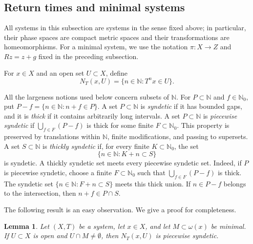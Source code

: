\documentclass[reqno,12pt]{amsart}
\newtheorem{lemma}[thm]{Lemma}
\newcommand{\Nzero}{\mathbb N_0}
\def \N {\mathbb N}
\def \Z {\mathbb Z}
\numberwithin{equation}{section}
\begin{document}

\subsection{Return times and minimal systems}

All systems in this subsection are systems in the sense fixed above; in
particular, their phase spaces are compact metric spaces and their
transformations are homeomorphisms. For a minimal system, we use the
notation $\pi:X\to Z$ and $Rz=z+g$ fixed in the preceding subsection.

For $x\in X$ and an open set $U\subset X$, define
\[
 N_T(x,U)=\{n\in\N:T^nx\in U\}.
\]

All the largeness notions used below concern subsets of $\N$. For
$P\subset\N$ and $f\in\Nzero$, put
$P-f=\{n\in\N:n+f\in P\}$. A set $P\subset\N$ is \emph{syndetic} if it
has bounded gaps, and it is \emph{thick} if it contains arbitrarily long
intervals. A set $P\subset\N$ is \emph{piecewise syndetic} if
$\bigcup_{f\in F}(P-f)$ is thick for some finite $F\subset\Nzero$. This
property is preserved by translations within $\N$, finite modifications,
and passing to supersets. A set $S\subset\N$ is \emph{thickly syndetic}
if, for every finite $K\subset\Nzero$, the set
\[
 \{n\in\N:K+n\subset S\}
\]
is syndetic. A thickly syndetic set meets every piecewise syndetic set.
Indeed, if $P$ is piecewise syndetic, choose a finite
$F\subset\Nzero$ such that $\bigcup_{f\in F}(P-f)$ is thick. The
syndetic set $\{n\in\N:F+n\subset S\}$ meets this thick union. If
$n\in P-f$ belongs to the intersection, then $n+f\in P\cap S$.

The following result is an easy observation. We give a proof for completeness.

\begin{lemma}\label{lem:ps-return}
Let $(X,T)$ be a system, let $x\in X$, and let
$M\subset\omega(x)$ be minimal. If $U\subset X$ is open and
$U\cap M\neq\emptyset$, then $N_T(x,U)$ is piecewise syndetic.
\end{lemma}
\end{document}
